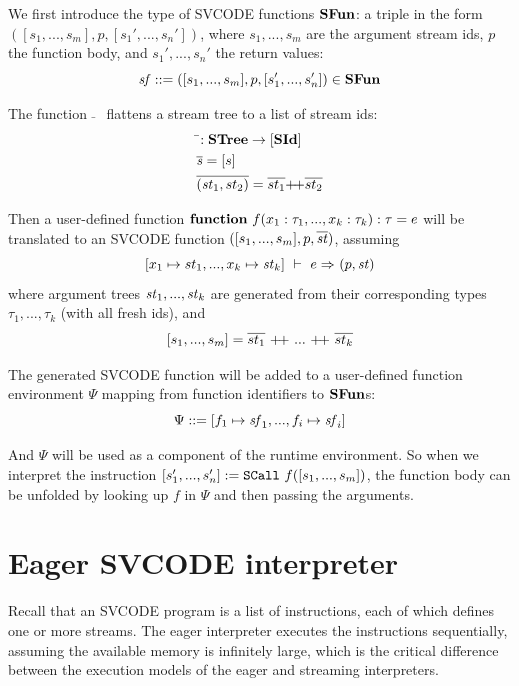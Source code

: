 We first introduce the type of SVCODE functions $\*{SFun}$: a triple in the form $([s_1,...,s_m], p, [s_1',...,s_n'])$, where $s_1,...,s_m$ are the argument stream ids, $p$ the function body, and $s_1',...,s_n'$ the return values:
$$ \sf ::= ([s_1,...,s_m], p, [s_1',...,s_n']) \in \*{SFun}$$

The function $\bar{}$ \ flattens a stream tree to a list of stream ids:
	\begin{align*}
&\bar{}: \STree \-> [\SId] \\
&\overline{\s} = [s] \\
&\overline{(\st_1,st_2)} = \overline{st_1} {\++} \overline{st_2}
\end{align*}


Then a user-defined function $\*{function} \  f(x_1: \tau_1, ..., x_k: \tau_k): \tau = e $ will be translated to an SVCODE function
$([s_1,...,s_m], p, \ol{\st})$, 
assuming
 $$\Trans{[x_1 \|-> st_1,..., x_k \|-> \st_k ]}{e}{}{}{\sfun{p}{\st}}$$ 
where argument trees $\st_1,...,\st_k$  are generated from their corresponding types $\tau_1,...,\tau_k$ (with all fresh ids), and
$$[s_1,...,s_m] = \ol{st_1} \ {\++} \ ... \ {\++} \ \ol{st_k}$$




The generated SVCODE function will be added to a user-defined function environment $\Psi$ mapping from function identifiers to $\*{SFun}$s:
$$ \Psi ::= [f_1 \|-> \sf_1,...,f_i \|-> \sf_i] $$

And $\Psi$ will be used as a component of the runtime environment. So when we interpret the instruction $\scall{f}{[s_1,...,s_m]}{[s_1',...,s_n']}$, the function body can be unfolded by looking up $f$ in $\Psi$ and then passing the arguments.

\section{Eager SVCODE interpreter}
Recall that an SVCODE program is a list of instructions, each of which defines one or more streams. 
The eager interpreter executes the instructions sequentially, assuming the available memory is infinitely large, which is the critical difference between the execution models of the eager and streaming interpreters.

